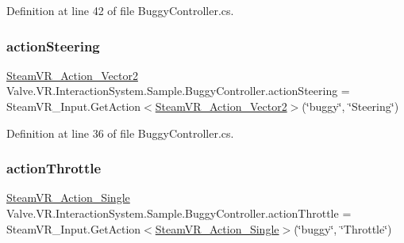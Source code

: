 Definition at line 42 of file Buggy\+Controller.\+cs.

\mbox{\label{class_valve_1_1_v_r_1_1_interaction_system_1_1_sample_1_1_buggy_controller_a14732cd93ca09edee2bf7528eadcd576}} 
\subsubsection{\texorpdfstring{actionSteering}{actionSteering}}
{\footnotesize\ttfamily \mbox{\hyperlink{class_valve_1_1_v_r_1_1_steam_v_r___action___vector2}{Steam\+V\+R\+\_\+\+Action\+\_\+\+Vector2}} Valve.\+V\+R.\+Interaction\+System.\+Sample.\+Buggy\+Controller.\+action\+Steering = Steam\+V\+R\+\_\+\+Input.\+Get\+Action$<$\mbox{\hyperlink{class_valve_1_1_v_r_1_1_steam_v_r___action___vector2}{Steam\+V\+R\+\_\+\+Action\+\_\+\+Vector2}}$>$(\char`\"{}buggy\char`\"{}, \char`\"{}Steering\char`\"{})}



Definition at line 36 of file Buggy\+Controller.\+cs.

\mbox{\label{class_valve_1_1_v_r_1_1_interaction_system_1_1_sample_1_1_buggy_controller_aafc93db769ee5b46c15239da08b2a505}} 
\subsubsection{\texorpdfstring{actionThrottle}{actionThrottle}}
{\footnotesize\ttfamily \mbox{\hyperlink{class_valve_1_1_v_r_1_1_steam_v_r___action___single}{Steam\+V\+R\+\_\+\+Action\+\_\+\+Single}} Valve.\+V\+R.\+Interaction\+System.\+Sample.\+Buggy\+Controller.\+action\+Throttle = Steam\+V\+R\+\_\+\+Input.\+Get\+Action$<$\mbox{\hyperlink{class_valve_1_1_v_r_1_1_steam_v_r___action___single}{Steam\+V\+R\+\_\+\+Action\+\_\+\+Single}}$>$(\char`\"{}buggy\char`\"{}, \char`\"{}Throttle\char`\"{})}



